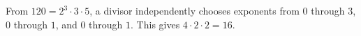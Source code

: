From $120=2^3\cdot3\cdot5$, a divisor independently chooses exponents from $0$ through $3$, $0$ through $1$, and $0$ through $1$. This gives $4\cdot2\cdot2=\boxed{16}$.
